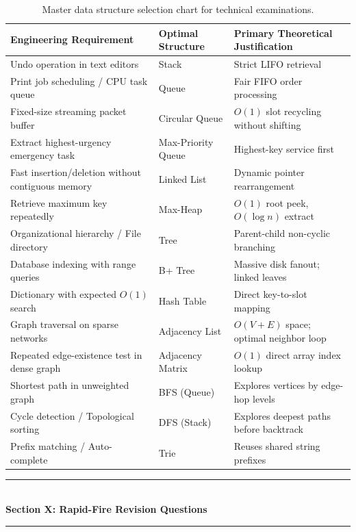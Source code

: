 \begin{table}[htbp]
\centering
\small
\begin{tabularx}{\textwidth}{p{7.5cm} l X}
\toprule
\textbf{Engineering Requirement} & \textbf{Optimal Structure} & \textbf{Primary Theoretical Justification} \\
\midrule
Undo operation in text editors & Stack & Strict LIFO retrieval \\
Print job scheduling / CPU task queue & Queue & Fair FIFO order processing \\
Fixed-size streaming packet buffer & Circular Queue & $O(1)$ slot recycling without shifting \\
Extract highest-urgency emergency task & Max-Priority Queue & Highest-key service first \\
Fast insertion/deletion without contiguous memory & Linked List & Dynamic pointer rearrangement \\
Retrieve maximum key repeatedly & Max-Heap & $O(1)$ root peek, $O(\log n)$ extract \\
Organizational hierarchy / File directory & Tree & Parent-child non-cyclic branching \\
Database indexing with range queries & B+ Tree & Massive disk fanout; linked leaves \\
Dictionary with expected $O(1)$ search & Hash Table & Direct key-to-slot mapping \\
Graph traversal on sparse networks & Adjacency List & $O(V+E)$ space; optimal neighbor loop \\
Repeated edge-existence test in dense graph & Adjacency Matrix & $O(1)$ direct array index lookup \\
Shortest path in unweighted graph & BFS (Queue) & Explores vertices by edge-hop levels \\
Cycle detection / Topological sorting & DFS (Stack) & Explores deepest paths before backtrack \\
Prefix matching / Auto-complete & Trie & Reuses shared string prefixes \\
\bottomrule
\end{tabularx}
\caption{Master data structure selection chart for technical examinations.}
\end{table}

\newpage
\begin{center}
\vspace{0.5em}
{\color{primary}\rule{0.45\textwidth}{1.2pt}}\\[4pt]
{\Large\bfseries\color{primary} Section X: Rapid-Fire Revision Questions}\\[2pt]
{\color{primary}\rule{0.45\textwidth}{1.2pt}}
\vspace{0.5em}
\end{center}

